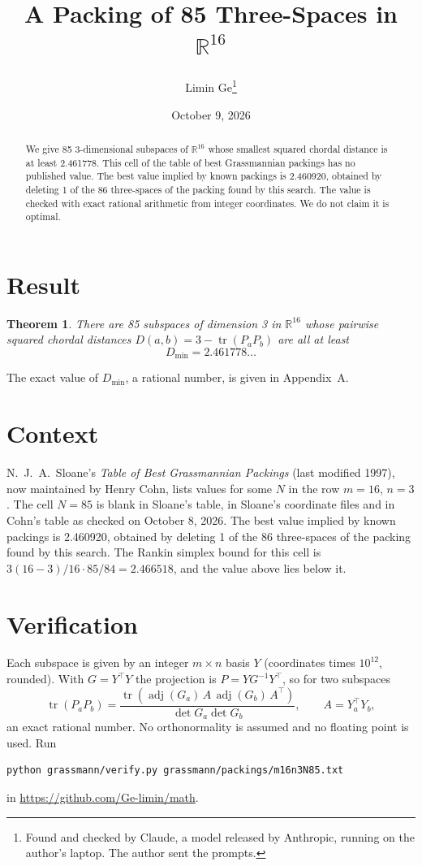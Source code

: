 \documentclass[11pt,a4paper]{article}
\title{A Packing of 85 Three-Spaces in $\mathbb{R}^{16}$}
\author{Limin Ge\thanks{Found and checked by Claude, a model released by Anthropic, running on the author's laptop. The author sent the prompts.}}
\date{October 9, 2026}
\newtheorem*{theorem}{Theorem}
\begin{document}
\maketitle
\begin{abstract}
We give 85 3-dimensional subspaces of $\mathbb{R}^{16}$ whose smallest squared chordal distance is at least 2.461778. This cell of the table of best Grassmannian packings has no published value. The best value implied by known packings is 2.460920, obtained by deleting 1 of the 86 three-spaces of the packing found by this search. The value is checked with exact rational arithmetic from integer coordinates. We do not claim it is optimal.
\end{abstract}

\section{Result}
\begin{theorem}
There are 85 subspaces of dimension 3 in $\mathbb{R}^{16}$ whose pairwise squared chordal distances $D(a,b) = 3 - \operatorname{tr}(P_aP_b)$ are all at least
\[ D_{\min} = 2.461778\ldots \]
\end{theorem}
The exact value of $D_{\min}$, a rational number, is given in Appendix~A.


\section{Context}
N.~J.~A.~Sloane's \emph{Table of Best Grassmannian Packings} (last modified 1997), now maintained by Henry Cohn, lists values for some $N$ in the row $m=16$, $n=3$. The cell $N=85$ is blank in Sloane's table, in Sloane's coordinate files and in Cohn's table as checked on October 8, 2026. The best value implied by known packings is 2.460920, obtained by deleting 1 of the 86 three-spaces of the packing found by this search. The Rankin simplex bound for this cell is $3(16-3)/16\cdot 85/84 = 2.466518$, and the value above lies below it.


\section{Verification}
Each subspace is given by an integer $m\times n$ basis $Y$ (coordinates times $10^{12}$, rounded). With $G=Y^\top Y$ the projection is $P=YG^{-1}Y^\top$, so for two subspaces
\[ \operatorname{tr}(P_aP_b)=\frac{\operatorname{tr}(\operatorname{adj}(G_a)\,A\,\operatorname{adj}(G_b)\,A^\top)}{\det G_a\det G_b},\qquad A=Y_a^\top Y_b, \]
an exact rational number. No orthonormality is assumed and no floating point is used. Run
\begin{verbatim}
python grassmann/verify.py grassmann/packings/m16n3N85.txt
\end{verbatim}
in \url{https://github.com/Ge-limin/math}.
\end{document}
